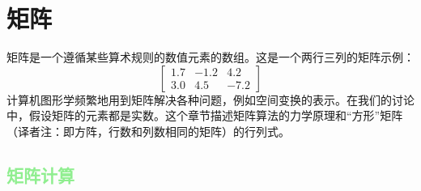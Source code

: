 \section{矩阵}

矩阵是一个遵循某些算术规则的数值元素的数组。这是一个两行三列的矩阵示例：
\[
  \left[\begin{array}{rrr}
      1.7 & -1.2 & 4.2  \\
      3.0 & 4.5  & -7.2
    \end{array}\right]
\]
计算机图形学频繁地用到矩阵解决各种问题，例如空间变换的表示。在我们的讨论中，假设矩阵的元素都是实数。这个章节描述矩阵算法的力学原理和“方形”矩阵（译者注：即方阵，行数和列数相同的矩阵）的行列式。

\subsection{\textcolor{lightgreen}{矩阵计算}}

